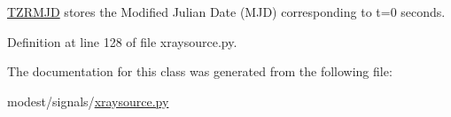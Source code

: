 \hyperlink{classmodest_1_1signals_1_1xraysource_1_1PeriodicXRaySource_aecd53533d34a4f821f4010c197edc2e8}{T\+Z\+R\+M\+JD} stores the Modified Julian Date (M\+JD) corresponding to t=0 seconds. 



Definition at line 128 of file xraysource.\+py.



The documentation for this class was generated from the following file\+:\begin{DoxyCompactItemize}
\item 
modest/signals/\hyperlink{xraysource_8py}{xraysource.\+py}\end{DoxyCompactItemize}
